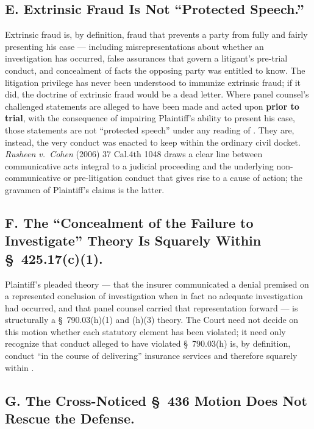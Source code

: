 \subsection*{E. Extrinsic Fraud Is Not ``Protected Speech.''}

Extrinsic fraud is, by definition, fraud that prevents a party from fully and fairly presenting his case --- including misrepresentations about whether an investigation has occurred, false assurances that govern a litigant's pre-trial conduct, and concealment of facts the opposing party was entitled to know. The litigation privilege has never been understood to immunize extrinsic fraud; if it did, the doctrine of extrinsic fraud would be a dead letter. Where panel counsel's challenged statements are alleged to have been made and acted upon \textbf{prior to trial}, with the consequence of impairing Plaintiff's ability to present his case, those statements are not ``protected speech'' under any reading of . They are, instead, the very conduct  was enacted to keep within the ordinary civil docket. \textit{Rusheen v.\ Cohen} (2006) 37 Cal.4th 1048 draws a clear line between communicative acts integral to a judicial proceeding and the underlying non-communicative or pre-litigation conduct that gives rise to a cause of action; the gravamen of Plaintiff's claims is the latter.

\subsection*{F. The ``Concealment of the Failure to Investigate'' Theory Is Squarely Within \S~425.17(c)(1).}

Plaintiff's pleaded theory --- that the insurer communicated a denial premised on a represented conclusion of investigation when in fact no adequate investigation had occurred, and that panel counsel carried that representation forward --- is structurally a \S~790.03(h)(1) and (h)(3) theory. The Court need not decide on this motion whether each statutory element has been violated; it need only recognize that conduct alleged to have violated \S~790.03(h) is, by definition, conduct ``in the course of delivering'' insurance services and therefore squarely within .

\subsection*{G. The Cross-Noticed \S~436 Motion Does Not Rescue the Defense.}

